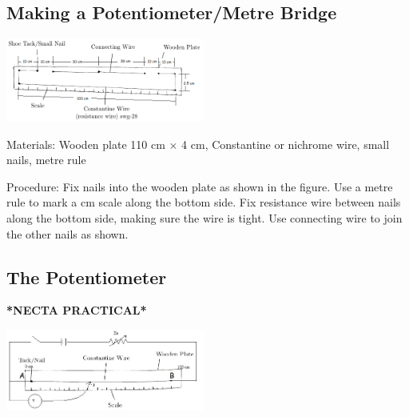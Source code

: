 \begin{multicols}{2}
\subsection{Making a Potentiometer/Metre Bridge}

\begin{center}
\includegraphics[width=0.49\textwidth]{./img/metre-bridge-2.png}
\end{center}

\begin{description*}
\item[Materials:]{Wooden plate 110 cm $\times$ 4 cm, Constantine or nichrome wire, small nails, metre rule}
\item[Procedure:]{Fix nails into the wooden plate as shown in the figure. Use a metre rule to mark a cm scale along the bottom side. Fix resistance wire between nails along the bottom side, making sure the wire is tight. Use connecting wire to join the other nails as shown.}
\end{description*}

\subsection{The Potentiometer}
\textbf{*NECTA PRACTICAL*}

\begin{center}
\includegraphics[width=0.49\textwidth]{./img/potentiometer.jpg}
\end{center}


\end{multicols}
